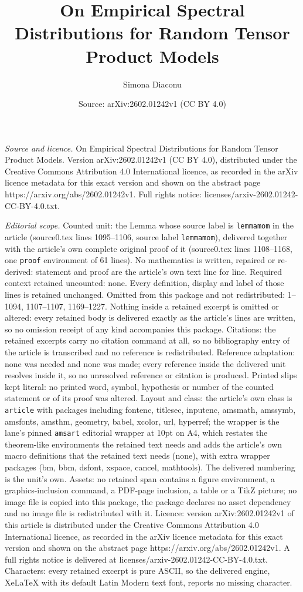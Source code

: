 \documentclass[10pt,a4paper]{amsart}
\title[On Empirical Spectral Distributions for Random Tensor Produc]{On Empirical Spectral Distributions for Random Tensor Product Models}
\author{Simona Diaconu}
\date{Source: arXiv:2602.01242v1 (CC BY 4.0)}
\begin{document}
\maketitle

\noindent\emph{Source and licence.} On Empirical Spectral Distributions for Random Tensor Product Models. Version arXiv:2602.01242v1 (CC BY 4.0), distributed under the Creative Commons Attribution 4.0 International licence, as recorded in the arXiv licence metadata for this exact version and shown on the abstract page https://arxiv.org/abs/2602.01242v1. Full rights notice: licenses/arxiv-2602.01242-CC-BY-4.0.txt.\par\smallskip

\noindent\textit{Editorial scope.} Counted unit: the Lemma whose source label is \texttt{lemmamom} in the article (source0.tex lines 1095--1106, source label \texttt{lemmamom}), delivered together with the article's own complete original proof of it (source0.tex lines 1108--1168, one \texttt{proof} environment of 61 lines). No mathematics is written, repaired or re-derived: statement and proof are the article's own text line for line. Required context retained uncounted: none. Every definition, display and label of those lines is retained unchanged. Omitted from this package and not redistributed: 1--1094, 1107--1107, 1169--1227. Nothing inside a retained excerpt is omitted or altered: every retained body is delivered exactly as the article's lines are written, so no omission receipt of any kind accompanies this package. Citations: the retained excerpts carry no citation command at all, so no bibliography entry of the article is transcribed and no reference is redistributed. Reference adaptation: none was needed and none was made; every reference inside the delivered unit resolves inside it, so no unresolved reference or citation is produced. Printed slips kept literal: no printed word, symbol, hypothesis or number of the counted statement or of its proof was altered. Layout and class: the article's own class is \texttt{article} with packages including fontenc, titlesec, inputenc, amsmath, amssymb, amsfonts, amsthm, geometry, babel, xcolor, url, hyperref; the wrapper is the lane's pinned \texttt{amsart} editorial wrapper at 10pt on A4, which restates the theorem-like environments the retained text needs and adds the article's own macro definitions that the retained text needs (none), with extra wrapper packages (bm, bbm, dsfont, xspace, cancel, mathtools). The delivered numbering is the unit's own. Assets: no retained span contains a figure environment, a graphics-inclusion command, a PDF-page inclusion, a table or a TikZ picture; no image file is copied into this package, the package declares no asset dependency and no image file is redistributed with it. Licence: version arXiv:2602.01242v1 of this article is distributed under the Creative Commons Attribution 4.0 International licence, as recorded in the arXiv licence metadata for this exact version and shown on the abstract page https://arxiv.org/abs/2602.01242v1. A full rights notice is delivered at licenses/arxiv-2602.01242-CC-BY-4.0.txt. Characters: every retained excerpt is pure ASCII, so the delivered engine, XeLaTeX with its default Latin Modern text font, reports no missing character.
\end{document}
